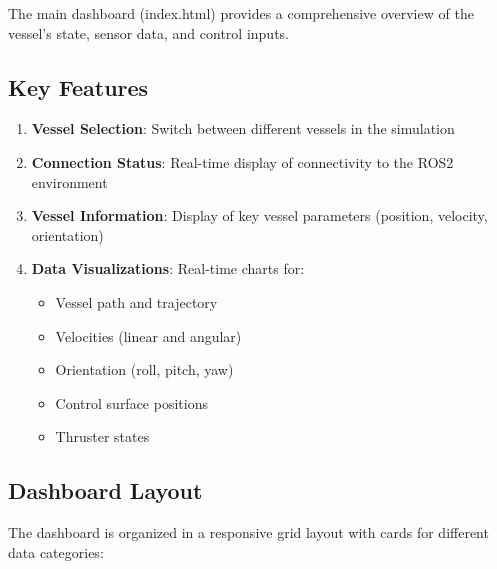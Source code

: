 \documentclass[
  letterpaper,
  DIV=11,
  numbers=noendperiod]{scrreprt}
\providecommand{\tightlist}{%
  \setlength{\itemsep}{0pt}\setlength{\parskip}{0pt}}\usepackage{longtable,booktabs,array}
\begin{document}

The main dashboard (index.html) provides a comprehensive overview of the
vessel's state, sensor data, and control inputs.

\subsection*{Key Features}\label{key-features-1}

\begin{enumerate}
\def\labelenumi{\arabic{enumi}.}
\tightlist
\item
  \textbf{Vessel Selection}: Switch between different vessels in the
  simulation
\item
  \textbf{Connection Status}: Real-time display of connectivity to the
  ROS2 environment
\item
  \textbf{Vessel Information}: Display of key vessel parameters
  (position, velocity, orientation)
\item
  \textbf{Data Visualizations}: Real-time charts for:

  \begin{itemize}
  \tightlist
  \item
    Vessel path and trajectory
  \item
    Velocities (linear and angular)
  \item
    Orientation (roll, pitch, yaw)
  \item
    Control surface positions
  \item
    Thruster states
  \end{itemize}
\end{enumerate}

\subsection*{Dashboard Layout}\label{dashboard-layout}

The dashboard is organized in a responsive grid layout with cards for
different data categories:
\end{document}
